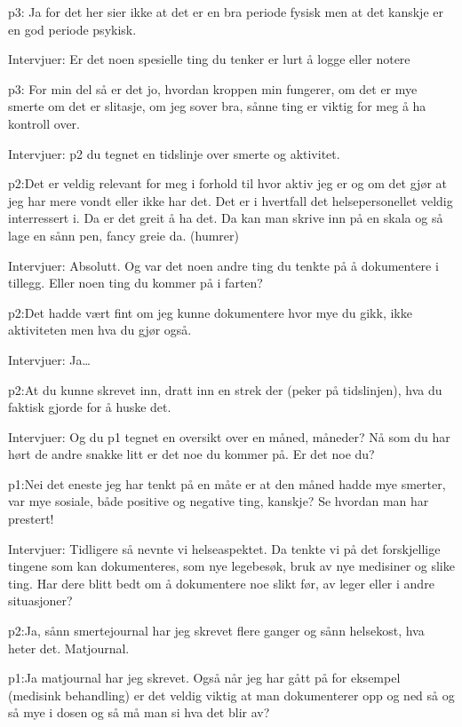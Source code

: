 \documentclass[11pt,UKenglish, a4paper]{article}
\begin{document}
\textcolor{myR} {p3:} Ja for det her sier ikke at det er en bra periode fysisk men at det kanskje er en god periode psykisk.

\textcolor{myBlue} {Intervjuer:} Er det noen spesielle ting du tenker er lurt å logge eller notere

\textcolor{myR} {p3:} For min del så er det jo, hvordan kroppen min fungerer, om det er mye smerte om det er slitasje, om jeg sover bra, sånne ting er viktig for meg å ha kontroll over.

\textcolor{myBlue} {Intervjuer:} p2 du tegnet en tidslinje over smerte og aktivitet.

\textcolor{myYellow} {p2:}Det er veldig relevant for meg i forhold til hvor aktiv jeg er og om det gjør at jeg har mere vondt eller ikke har det. Det er i hvertfall det helsepersonellet veldig interressert i. Da er det greit å ha det. Da kan man skrive inn på en skala og så lage en sånn pen, fancy greie da. (humrer)

\textcolor{myBlue} {Intervjuer:} Absolutt. Og var det noen andre ting du tenkte på å dokumentere i tillegg. Eller noen ting du kommer på i farten?

\textcolor{myYellow} {p2:}Det hadde vært fint om jeg kunne dokumentere hvor mye du gikk, ikke aktiviteten men hva du gjør også.

\textcolor{myBlue} {Intervjuer:} Ja\dots

\textcolor{myYellow} {p2:}At du kunne skrevet inn, dratt inn en strek der (peker på tidslinjen), hva du faktisk gjorde for å huske det.

\textcolor{myBlue} {Intervjuer:} Og du p1 tegnet en oversikt over en måned, måneder? Nå som du har hørt de andre snakke litt er det noe du kommer på. Er det noe du?

\textcolor{myGreen} {p1:}Nei det eneste jeg har tenkt på en måte er at den måned hadde mye smerter, var mye sosiale, både positive og negative ting, kanskje? Se hvordan man har prestert!

\textcolor{myBlue} {Intervjuer:} Tidligere så nevnte vi helseaspektet. Da tenkte vi på det forskjellige tingene som kan dokumenteres, som nye legebesøk, bruk av nye medisiner og slike ting. Har dere blitt bedt om å dokumentere noe slikt før, av leger eller i andre situasjoner?

\textcolor{myYellow} {p2:}Ja, sånn smertejournal har jeg skrevet flere ganger og sånn helsekost, hva heter det. Matjournal.

\textcolor{myGreen} {p1:}Ja matjournal har jeg skrevet. Også når jeg har gått på for eksempel (medisink behandling) er det veldig viktig at man dokumenterer opp og ned så og så mye i dosen og så må man si hva det blir av?
\end{document}
